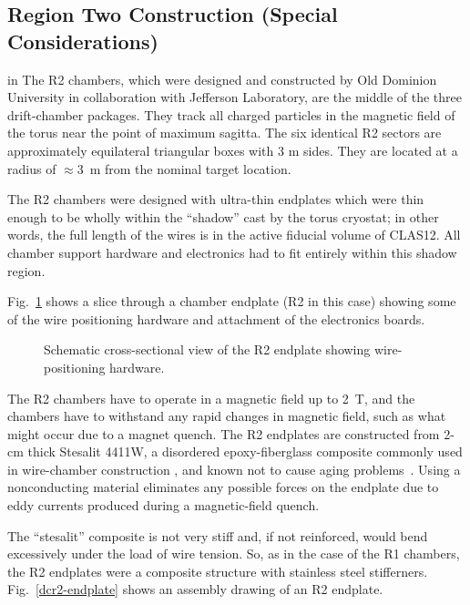 
\subsection{Region Two Construction (Special Considerations)}

 in 
The R2 chambers, which were designed and constructed by Old Dominion University 
in collaboration with Jefferson Laboratory, are the middle of the three  
drift-chamber packages.  They track all charged particles in the magnetic field 
of the torus near the point of maximum sagitta.  The six identical R2 sectors 
are approximately equilateral triangular boxes with 3 m sides. 
They are located at a radius of $\approx$3~m from the nominal target location.  
  
The R2 chambers were designed with ultra-thin endplates which were thin enough
to be wholly within the ``shadow'' cast by the torus cryostat; in other words,
the full length of the wires is in the active fiducial volume of CLAS12. 
All chamber support hardware and electronics had to fit 
entirely within this shadow region.


Fig.~\ref{dc-corner} shows a slice through a chamber endplate (R2 in this case)
showing some of the wire positioning hardware and attachment of the electronics 
boards.
\begin{figure}[htpb]   
\vspace{8cm}Schematic cross-sectional view of the R2 endplate showing
wire-positioning hardware.
\caption{\small{}}
\label{dc-corner}
\end{figure}   


The R2 chambers have to operate 
in a magnetic field up to 2~T, and the chambers have to withstand any rapid 
changes in magnetic field, such as what might occur due to a magnet quench.
The R2 endplates are constructed from 2-cm thick Stesalit 4411W, a disordered 
epoxy-fiberglass composite commonly used in wire-chamber construction
\cite{stesalit}, and known not to cause aging problems~\cite{stesalitaging}.  
Using a nonconducting material eliminates any possible forces on the endplate 
due to eddy currents produced during a magnetic-field quench.  

The ``stesalit'' composite is not very stiff and, if not reinforced, would
bend excessively under the load of wire tension.  So, as in the case of
the R1 chambers, the R2 endplates were a composite structure with
stainless steel stifferners.  Fig.~\ref{dcr2-endplate} shows an assembly drawing of an R2 endplate.

